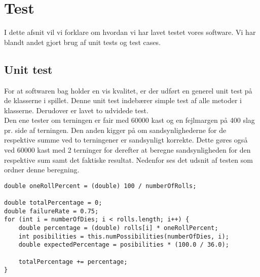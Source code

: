 \chapter{Test}

I dette afsnit vil vi forklare om hvordan vi har lavet testet vores software.
Vi har blandt andet gjort brug af unit tests og test cases.

\section{Unit test}

For at softwaren bag holder en vis kvalitet, er der udført en generel unit test på de klasserne i spillet.
Denne unit test indebærer simple test af alle metoder i klasserne.
Derudover er lavet to udvidede test.
\\
Den ene tester om terningen er fair med 60000 kast og en fejlmargen på 400 slag pr. side af terningen.
Den anden kigger på om sandsynlighederne for de respektive summe ved to terningener er sandsynligt korrekte.
Dette gøres også ved 60000 kast med 2 terninger for derefter at beregne sandsynligheden for den respektive sum samt det faktiske resultat.
Nedenfor ses det udsnit af testen som ordner denne beregning.
\\

\begin{lstlisting}
double oneRollPercent = (double) 100 / numberOfRolls;
    
double totalPercentage = 0;
double failureRate = 0.75;
for (int i = numberOfDies; i < rolls.length; i++) {
    double percentage = (double) rolls[i] * oneRollPercent;
    int posibilities = this.numPossibilities(numberOfDies, i);
    double expectedPercentage = posibilities * (100.0 / 36.0);

    totalPercentage += percentage;
}
\end{lstlisting}
